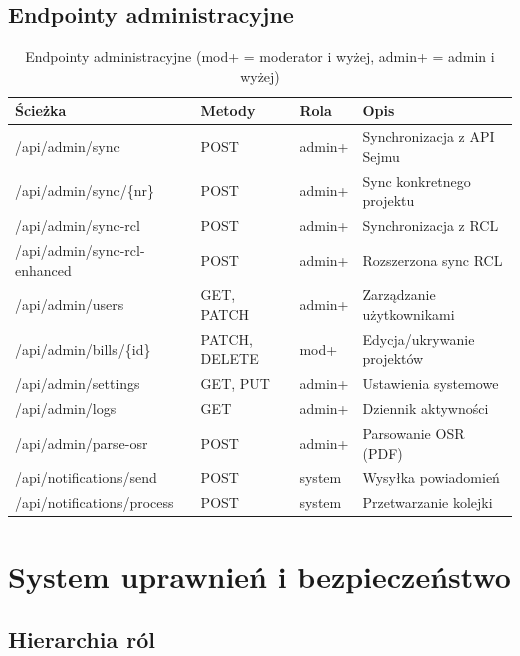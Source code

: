 \documentclass[12pt,a4paper]{article}
\begin{document}
\subsection{Endpointy administracyjne}

\begin{table}[H]
\centering
\renewcommand{\arraystretch}{1.3}
\footnotesize
\begin{tabularx}{\textwidth}{l l l X}
\toprule
\textbf{Ścieżka} & \textbf{Metody} & \textbf{Rola} & \textbf{Opis} \\
\midrule
/api/admin/sync & POST & admin+ & Synchronizacja z API Sejmu \\
/api/admin/sync/\{nr\} & POST & admin+ & Sync konkretnego projektu \\
/api/admin/sync-rcl & POST & admin+ & Synchronizacja z RCL \\
/api/admin/sync-rcl-enhanced & POST & admin+ & Rozszerzona sync RCL \\
/api/admin/users & GET, PATCH & admin+ & Zarządzanie użytkownikami \\
/api/admin/bills/\{id\} & PATCH, DELETE & mod+ & Edycja/ukrywanie projektów \\
/api/admin/settings & GET, PUT & admin+ & Ustawienia systemowe \\
/api/admin/logs & GET & admin+ & Dziennik aktywności \\
/api/admin/parse-osr & POST & admin+ & Parsowanie OSR (PDF) \\
/api/notifications/send & POST & system & Wysyłka powiadomień \\
/api/notifications/process & POST & system & Przetwarzanie kolejki \\
\bottomrule
\end{tabularx}
\caption{Endpointy administracyjne (mod+ = moderator i wyżej, admin+ = admin i wyżej)}
\end{table}

\newpage

\section{System uprawnień i bezpieczeństwo}

\subsection{Hierarchia ról}
\end{document}
